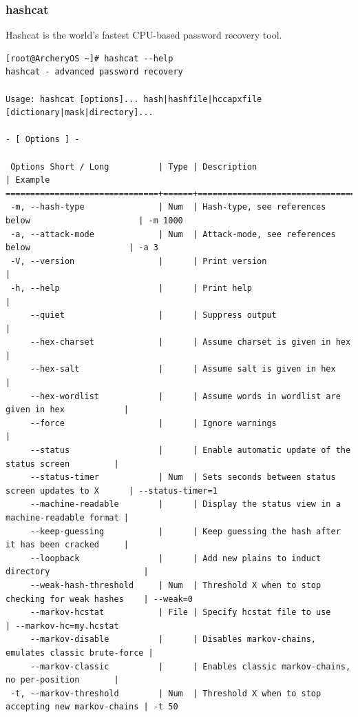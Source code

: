 \documentclass{article}
\begin{document}
\subsubsection{hashcat}
Hashcat is the world’s fastest CPU-based password recovery tool.
\begin{lstlisting}
[root@ArcheryOS ~]# hashcat --help
hashcat - advanced password recovery

Usage: hashcat [options]... hash|hashfile|hccapxfile [dictionary|mask|directory]...

- [ Options ] -

 Options Short / Long          | Type | Description                                          | Example
===============================+======+======================================================+=======================
 -m, --hash-type               | Num  | Hash-type, see references below                      | -m 1000
 -a, --attack-mode             | Num  | Attack-mode, see references below                    | -a 3
 -V, --version                 |      | Print version                                        |
 -h, --help                    |      | Print help                                           |
     --quiet                   |      | Suppress output                                      |
     --hex-charset             |      | Assume charset is given in hex                       |
     --hex-salt                |      | Assume salt is given in hex                          |
     --hex-wordlist            |      | Assume words in wordlist are given in hex            |
     --force                   |      | Ignore warnings                                      |
     --status                  |      | Enable automatic update of the status screen         |
     --status-timer            | Num  | Sets seconds between status screen updates to X      | --status-timer=1
     --machine-readable        |      | Display the status view in a machine-readable format |
     --keep-guessing           |      | Keep guessing the hash after it has been cracked     |
     --loopback                |      | Add new plains to induct directory                   |
     --weak-hash-threshold     | Num  | Threshold X when to stop checking for weak hashes    | --weak=0
     --markov-hcstat           | File | Specify hcstat file to use                           | --markov-hc=my.hcstat
     --markov-disable          |      | Disables markov-chains, emulates classic brute-force |
     --markov-classic          |      | Enables classic markov-chains, no per-position       |
 -t, --markov-threshold        | Num  | Threshold X when to stop accepting new markov-chains | -t 50

\end{lstlisting}
\end{document}
